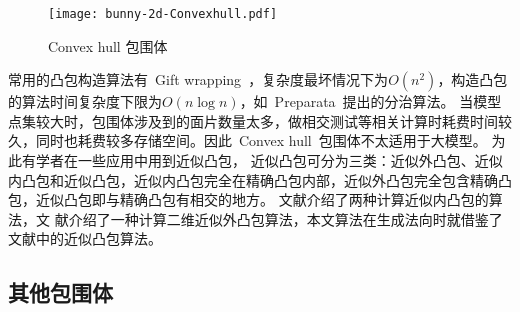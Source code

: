 \begin{figure}[H] %
  \centering
  \texttt{[image: bunny-2d-Convexhull.pdf]}
  \caption{Convex hull 包围体}
  \label{fig:convexhull-bunny}
\end{figure}

常用的凸包构造算法有~Gift wrapping~\cite{Chand1970An}，复杂度最坏情况下为$O(n^2)$，构造凸包的算法时间复杂度下限为$O(n\log n)$，如~Preparata~提出的分治算法\cite{Preparata1977}。
当模型点集较大时，包围体涉及到的面片数量太多，做相交测试等相关计算时耗费时间较久，同时也耗费较多存储空间。因此~Convex hull~包围体不太适用于大模型。
为此有学者在一些应用中用到近似凸包，
近似凸包可分为三类：近似外凸包、近似内凸包和近似凸包\cite{hossain2013constructing}，近似内凸包完全在精确凸包内部，近似外凸包完全包含精确凸包，近似凸包即与精确凸包有相交的地方。
文献介绍了两种计算近似内凸包的算法，文
献介绍了一种计算二维近似外凸包算法，本文算法在生成法向时就借鉴了文献中的近似凸包算法。

\subsection{其他包围体}

